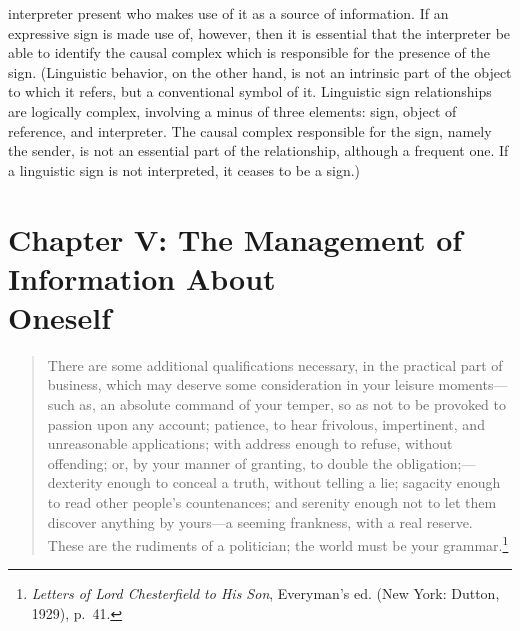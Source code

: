 \documentclass[openany,nobib]{tufte-book}
\let\oldchapter\chapter
\def\chapter{%
  \setcounter{footnote}{0}%
  \oldchapter
}
\begin{document}
\begin{enumerate}
  interpreter present who makes use of it as a source of information. If
  an expressive sign is made use of, however, then it is essential that
  the interpreter be able to identify the causal complex which is
  responsible for the presence of the sign. (Linguistic behavior, on the
  other hand, is not an intrinsic part of the object to which it refers,
  but a conventional symbol of it. Linguistic sign relationships are
  logically complex, involving a minus of three elements: sign, object
  of reference, and interpreter. The causal complex responsible for the
  sign, namely the sender, is not an essential part of the relationship,
  although a frequent one. If a linguistic sign is not interpreted, it
  ceases to be a sign.)
\end{enumerate}


\chapter[CHAPTER V: THE MANAGEMENT OF INFORMATION ABOUT ONESELF]{Chapter V: The Management of Information About\\ Oneself}
\label{ch:Chapter V: The Management of Information About Oneself}

\begin{quote}
There are some additional qualifications necessary, in the practical
part of business, which may deserve some con­sideration in your leisure
moments---such as, an absolute command of your temper, so as not to be
provoked to passion upon any account; patience, to hear frivolous,
impertinent, and unreasonable applications; with address enough to
re­fuse, without offending; or, by your manner of granting, to double the
obligation;---dexterity enough to conceal a truth, without telling a
lie; sagacity enough to read other people's countenances; and serenity
enough not to let them discover anything by yours---a seeming frankness,
with a real reserve. These are the rudiments of a politician; the world
must be your grammar.\footnote{\emph{Letters of Lord Chesterfield to His
  Son}, Everyman's ed. (New York: Dutton, 1929), p.~41.}
\end{quote}
\end{document}
